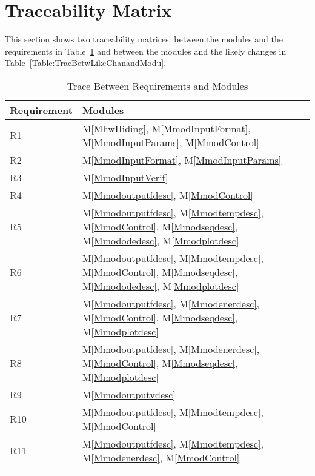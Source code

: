 \documentclass[12pt]{article}
\begin{document}
\section{Traceability Matrix}
\label{Sec:TracMatr}
This section shows two traceability matrices: between the modules and the requirements in Table~\ref{Table:TracBetwRequandModu} and between the modules and the likely changes in Table~\ref{Table:TracBetwLikeChanandModu}.
\begin{longtable}{l l}
\toprule
Requirement & Modules
\\
\midrule
R1 & M\ref{MhwHiding}, M\ref{MmodInputFormat}, M\ref{MmodInputParams}, M\ref{MmodControl}
\\
R2 & M\ref{MmodInputFormat}, M\ref{MmodInputParams}
\\
R3 & M\ref{MmodInputVerif}
\\
R4 & M\ref{Mmodoutputfdesc}, M\ref{MmodControl}
\\
R5 & M\ref{Mmodoutputfdesc}, M\ref{Mmodtempdesc}, M\ref{MmodControl}, M\ref{Mmodseqdesc}, M\ref{Mmododedesc}, M\ref{Mmodplotdesc}
\\
R6 & M\ref{Mmodoutputfdesc}, M\ref{Mmodtempdesc}, M\ref{MmodControl}, M\ref{Mmodseqdesc}, M\ref{Mmododedesc}, M\ref{Mmodplotdesc}
\\
R7 & M\ref{Mmodoutputfdesc}, M\ref{Mmodenerdesc}, M\ref{MmodControl}, M\ref{Mmodseqdesc}, M\ref{Mmodplotdesc}
\\
R8 & M\ref{Mmodoutputfdesc}, M\ref{Mmodenerdesc}, M\ref{MmodControl}, M\ref{Mmodseqdesc}, M\ref{Mmodplotdesc}
\\
R9 & M\ref{Mmodoutputvdesc}
\\
R10 & M\ref{Mmodoutputfdesc}, M\ref{Mmodtempdesc}, M\ref{MmodControl}
\\
R11 & M\ref{Mmodoutputfdesc}, M\ref{Mmodtempdesc}, M\ref{Mmodenerdesc}, M\ref{MmodControl}
\\
\bottomrule
\caption{Trace Between Requirements and Modules}
\label{Table:TracBetwRequandModu}
\end{longtable}
\end{document}
